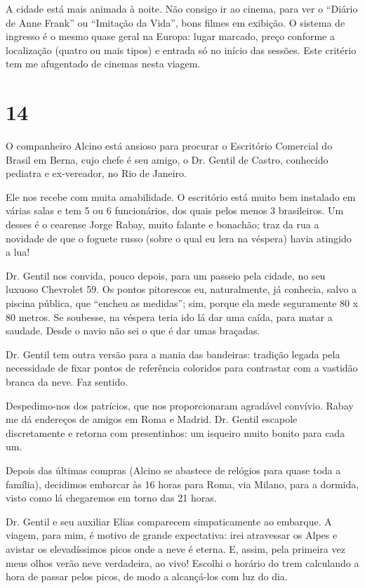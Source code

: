 A cidade está mais animada à noite. Não consigo ir ao cinema, para ver o ``Diário de Anne Frank'' ou ``Imitação da Vida'', bons filmes em exibição. O sistema de ingresso é o mesmo quase geral na Europa: lugar marcado, preço conforme a localização (quatro ou mais tipos) e entrada só no início das sessões. Este critério tem me afugentado de cinemas nesta viagem.

\section*{14 \adfflatleafright {}}
O companheiro Alcino está ansioso para procurar o Escritório Comercial do Brasil em Berna, cujo chefe é seu amigo, o Dr. Gentil de Castro, conhecido pediatra e ex-vereador, no Rio de Janeiro.

Ele nos recebe com muita amabilidade. O escritório está muito bem instalado em várias salas e tem 5 ou 6 funcionários, dos quais pelos menos 3 brasileiros. Um desses é o cearense Jorge Rabay, muito falante e bonachão; traz da rua a novidade de que o foguete russo (sobre o qual eu lera na véspera) havia atingido a lua!

Dr. Gentil nos convida, pouco depois, para um passeio pela cidade, no seu luxuoso Chevrolet 59. Os pontos pitorescos eu, naturalmente, já conhecia, salvo a piscina pública, que ``encheu as medidas''; sim, porque ela mede seguramente 80 x 80 metros. Se soubesse, na véspera teria ido lá dar uma caída, para matar a saudade. Desde o navio não sei o que é dar umas braçadas.

Dr. Gentil tem outra versão para a mania das bandeiras: tradição legada pela necessidade de fixar pontos de referência coloridos para contrastar com a vastidão branca da neve. Faz sentido.

Despedimo-nos dos patrícios, que nos proporcionaram agradável convívio. Rabay me dá endereços de amigos em Roma e Madrid. Dr. Gentil escapole discretamente e retorna com presentinhos: um isqueiro muito bonito para cada um.

Depois das últimas compras (Alcino se abastece de relógios para quase toda a família), decidimos embarcar às 16 horas para Roma, via Milano, para a dormida, visto como lá chegaremos em torno das 21 horas.

Dr. Gentil e seu auxiliar Elias comparecem simpaticamente ao embarque. A viagem, para mim, é motivo de grande expectativa: irei atravessar os Alpes e avistar os elevadíssimos picos onde a neve é eterna. E, assim, pela primeira vez meus olhos verão neve verdadeira, ao vivo! Escolhi o horário do trem calculando a hora de passar pelos picos, de modo a alcançá-los com luz do dia.

